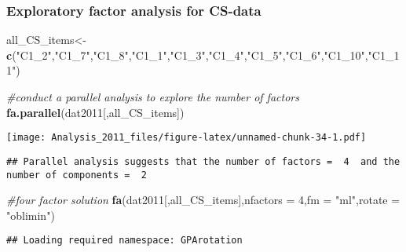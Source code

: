 \documentclass[
]{article}
\newenvironment{Shaded}{\begin{snugshade}}{\end{snugshade}}
\newcommand{\CommentTok}[1]{\textcolor[rgb]{0.56,0.35,0.01}{\textit{#1}}}
\newcommand{\DataTypeTok}[1]{\textcolor[rgb]{0.13,0.29,0.53}{#1}}
\newcommand{\DecValTok}[1]{\textcolor[rgb]{0.00,0.00,0.81}{#1}}
\newcommand{\KeywordTok}[1]{\textcolor[rgb]{0.13,0.29,0.53}{\textbf{#1}}}
\newcommand{\NormalTok}[1]{#1}
\newcommand{\StringTok}[1]{\textcolor[rgb]{0.31,0.60,0.02}{#1}}
\begin{document}
\hypertarget{exploratory-factor-analysis-for-cs-data}{%
\subsubsection{Exploratory factor analysis for
CS-data}\label{exploratory-factor-analysis-for-cs-data}}

\begin{Shaded}
\begin{Highlighting}[]
\NormalTok{all_CS_items<-}\KeywordTok{c}\NormalTok{(}\StringTok{"C1_2"}\NormalTok{,}\StringTok{"C1_7"}\NormalTok{,}\StringTok{"C1_8"}\NormalTok{,}\StringTok{"C1_1"}\NormalTok{,}\StringTok{"C1_3"}\NormalTok{,}\StringTok{"C1_4"}\NormalTok{,}\StringTok{"C1_5"}\NormalTok{,}\StringTok{"C1_6"}\NormalTok{,}\StringTok{"C1_10"}\NormalTok{,}\StringTok{"C1_11"}\NormalTok{)}

\CommentTok{#conduct a parallel analysis to explore the number of factors}
\KeywordTok{fa.parallel}\NormalTok{(dat2011[,all_CS_items])}
\end{Highlighting}
\end{Shaded}

\texttt{[image: Analysis\_2011\_files/figure-latex/unnamed-chunk-34-1.pdf]}

\begin{verbatim}
## Parallel analysis suggests that the number of factors =  4  and the number of components =  2
\end{verbatim}

\begin{Shaded}
\begin{Highlighting}[]
\CommentTok{#four factor solution}
\KeywordTok{fa}\NormalTok{(dat2011[,all_CS_items],}\DataTypeTok{nfactors =} \DecValTok{4}\NormalTok{,}\DataTypeTok{fm =} \StringTok{"ml"}\NormalTok{,}\DataTypeTok{rotate =} \StringTok{"oblimin"}\NormalTok{)}
\end{Highlighting}
\end{Shaded}

\begin{verbatim}
## Loading required namespace: GPArotation
\end{verbatim}
\end{document}
